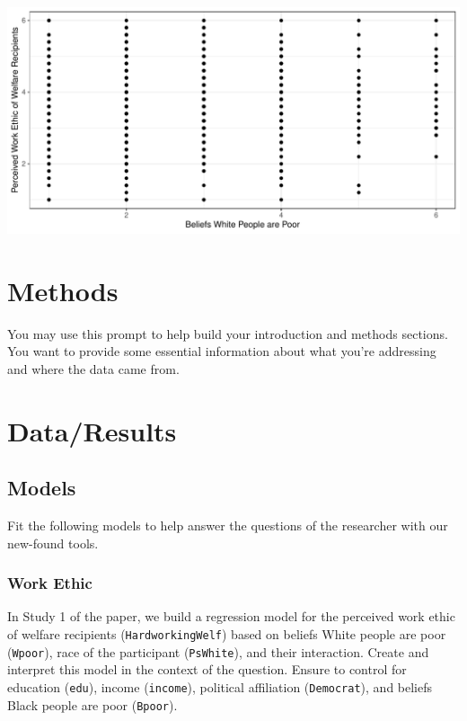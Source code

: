 \documentclass{article}\usepackage[]{graphicx}\usepackage[]{color}
\newenvironment{Figure}
  {\par\medskip\noindent\minipage{\linewidth}}
  {\endminipage\par\medskip}
\begin{document}
\begin{multicols}{2}
\begin{Figure}
\begin{center}
\includegraphics[width=\linewidth]{figure/workethic.pdf} %
\label{bayespic}
\end{center}
\end{Figure}

\section{Methods}
You may use this prompt to help build your introduction and methods sections. You want to provide some essential information about what you're addressing
and where the data came from.

\section{Data/Results}
\subsection{Models}
Fit the following models to help answer the questions of the researcher with our new-found tools.

\subsubsection{Work Ethic}
In Study 1 of the paper, we build a regression model for the perceived work ethic of welfare recipients (\texttt{HardworkingWelf}) based on beliefs White people are poor (\texttt{Wpoor}), race of the participant (\texttt{PsWhite}), and their interaction. Create and interpret this model in the context of the question. Ensure to control for education (\texttt{edu}), income (\texttt{income}), political affiliation (\texttt{Democrat}), and beliefs Black people are poor (\texttt{Bpoor}).


\end{multicols}
\end{document}
